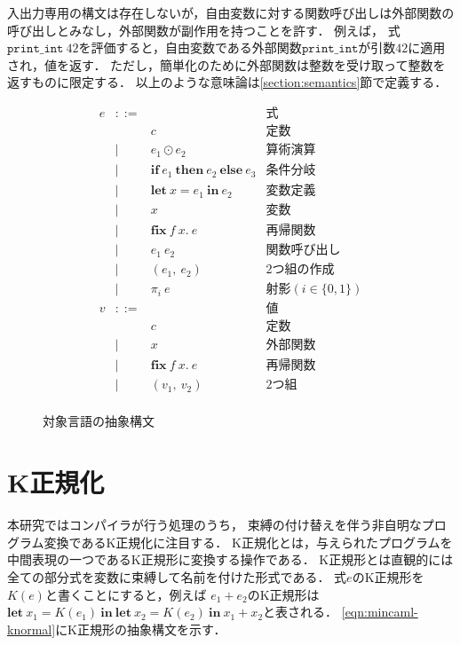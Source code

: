 \documentclass{compsoft}
\newcommand{\keyword}[1]{\mathbf{#1}}
\newcommand{\IF}{\keyword{if}}
\newcommand{\THEN}{\keyword{then}}
\newcommand{\ELSE}{\keyword{else}}
\newcommand{\LET}{\keyword{let}}
\newcommand{\FIX}{\keyword{fix}}
\newcommand{\IN}{\keyword{in}}
\begin{document}
入出力専用の構文は存在しないが，自由変数に対する関数呼び出しは外部関数の呼び出しとみなし，外部関数が副作用を持つことを許す．
例えば，
式$\texttt{print\_int}~42$を評価すると，自由変数である外部関数$\texttt{print\_int}$が引数$42$に適用され，値を返す．
ただし，簡単化のために外部関数は整数を受け取って整数を返すものに限定する．
以上のような意味論は\ref{section:semantics}節で定義する．

\begin{figure}[tp]
	\[ \begin{array}{lcll}
		e & ::= & & \mbox{式} \\
				& & c	& \mbox{定数} \\
				& | & e_1 \odot e_2 & \mbox{算術演算} \\
				& | & \IF~e_1~\THEN~e_2~\ELSE~e_3 & \mbox{条件分岐} \\
				& | & \LET~x=e_1~\IN~e_2 & \mbox{変数定義} \\
				& | & x & \mbox{変数} \\
				& | & \FIX~f~x.~e & \mbox{再帰関数} \\
				& | & e_1~e_2 & \mbox{関数呼び出し} \\
				& | & (e_1,~e_2) & \mbox{2つ組の作成} \\
				& | & \pi_i~e & \mbox{射影}(i \in \{0, 1\}) \\
			v & ::= & & \mbox{値} \\
				& & c & \mbox{定数} \\
				& | & x & \mbox{外部関数} \\
				& | & \FIX~f~x.~e & \mbox{再帰関数} \\
				& | & (v_1,~v_2) & \mbox{2つ組} \\
	\end{array} \]
	\caption{対象言語の抽象構文}
	\label{eqn:mincaml-ast}
\end{figure}

\section{K正規化}\label{section:knormal}
本研究ではコンパイラが行う処理のうち，
束縛の付け替えを伴う非自明なプログラム変換であるK正規化に注目する．
K正規化とは，与えられたプログラムを中間表現の一つであるK正規形\cite{Birkedal:1996:RIV:237721.237771}に変換する操作である．
K正規形とは直観的には全ての部分式を変数に束縛して名前を付けた形式である．
式$e$のK正規形を$K(e)$と書くことにすると，例えば
$e_1+e_2$のK正規形は$\LET~x_1=K(e_1)~\IN~\LET~x_2=K(e_2)~\IN~x_1+x_2$と表される．
\figurename\ref{eqn:mincaml-knormal}にK正規形の抽象構文を示す．
\end{document}
